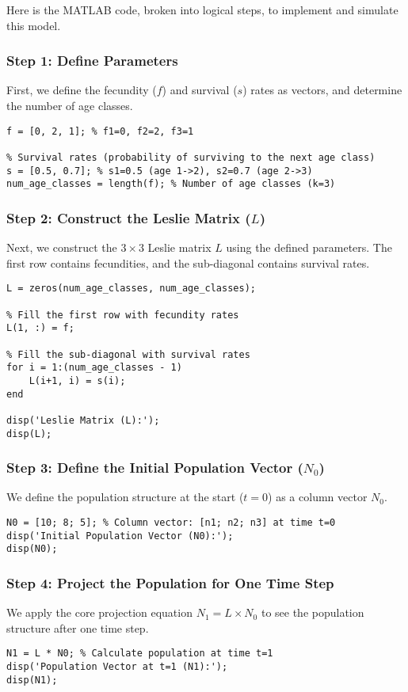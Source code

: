 \documentclass{article}
\begin{document}
Here is the MATLAB code, broken into logical steps, to implement and simulate this model.

\subsubsection{Step 1: Define Parameters}
First, we define the fecundity ($f$) and survival ($s$) rates as vectors, and determine the number of age classes.
\begin{lstlisting}[caption={Define demographic parameters}]
% Fecundity rates (average offspring per individual in each age class)
f = [0, 2, 1]; % f1=0, f2=2, f3=1

% Survival rates (probability of surviving to the next age class)
s = [0.5, 0.7]; % s1=0.5 (age 1->2), s2=0.7 (age 2->3)
num_age_classes = length(f); % Number of age classes (k=3)
\end{lstlisting}

\subsubsection{Step 2: Construct the Leslie Matrix ($L$)}
Next, we construct the $3 \times 3$ Leslie matrix $L$ using the defined parameters. The first row contains fecundities, and the sub-diagonal contains survival rates.
\begin{lstlisting}[caption={Construct the Leslie Matrix}]
L = zeros(num_age_classes, num_age_classes);

% Fill the first row with fecundity rates
L(1, :) = f;

% Fill the sub-diagonal with survival rates
for i = 1:(num_age_classes - 1)
    L(i+1, i) = s(i);
end

disp('Leslie Matrix (L):');
disp(L);
\end{lstlisting}

\subsubsection{Step 3: Define the Initial Population Vector ($N_0$)}
We define the population structure at the start ($t=0$) as a column vector $N_0$.
\begin{lstlisting}[caption={Define the initial population}]
N0 = [10; 8; 5]; % Column vector: [n1; n2; n3] at time t=0
disp('Initial Population Vector (N0):');
disp(N0);
\end{lstlisting}

\subsubsection{Step 4: Project the Population for One Time Step}
We apply the core projection equation $N_1 = L \times N_0$ to see the population structure after one time step.
\begin{lstlisting}[caption={Project population one step ahead}]
N1 = L * N0; % Calculate population at time t=1
disp('Population Vector at t=1 (N1):');
disp(N1);
\end{lstlisting}
\end{document}
